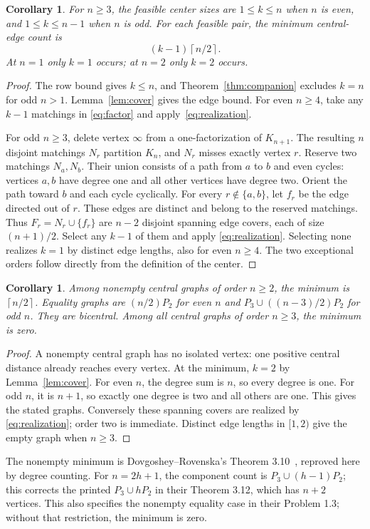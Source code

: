 \documentclass[11pt]{article}
\newtheorem{corollary}[theorem]{Corollary}
\newcommand{\ceil}[1]{\left\lceil #1\right\rceil}
\begin{document}
\begin{corollary}\label{cor:allk}
For $n\ge3$, the feasible center sizes are $1\le k\le n$ when $n$
is even, and $1\le k\le n-1$ when $n$ is odd. For each feasible pair,
the minimum central-edge count is
\[
 (k-1)\ceil{n/2}.
\]
At $n=1$ only $k=1$ occurs; at $n=2$ only $k=2$ occurs.
\end{corollary}
\begin{proof}
The row bound gives $k\le n$, and Theorem~\ref{thm:companion}
excludes $k=n$ for odd $n>1$. Lemma~\ref{lem:cover} gives the edge
bound. For even $n\ge4$, take any $k-1$ matchings in
\eqref{eq:factor} and apply~\eqref{eq:realization}.

For odd $n\ge3$, delete vertex $\infty$ from a one-factorization of
$K_{n+1}$. The resulting $n$ disjoint matchings $N_r$ partition
$K_n$, and $N_r$ misses exactly vertex $r$. Reserve two matchings
$N_a,N_b$. Their union consists of a path from $a$ to $b$ and even
cycles: vertices $a,b$ have degree one and all other vertices have
degree two. Orient the path toward $b$ and each cycle cyclically.
For every $r\notin\{a,b\}$, let $f_r$ be the edge directed out of
$r$. These edges are distinct and belong to the reserved matchings.
Thus $F_r=N_r\cup\{f_r\}$ are $n-2$ disjoint spanning edge covers,
each of size $(n+1)/2$. Select any $k-1$ of them and apply
\eqref{eq:realization}. Selecting none realizes $k=1$ by distinct
edge lengths, also for even $n\ge4$. The two exceptional orders
follow directly from the definition of the center.
\end{proof}

\begin{corollary}\label{cor:graph}
Among nonempty central graphs of order $n\ge2$, the minimum is
$\ceil{n/2}$. Equality graphs are $(n/2)P_2$ for even $n$ and
$P_3\cup((n-3)/2)P_2$ for odd $n$. They are bicentral.
Among all central graphs of order $n\ge3$, the minimum is zero.
\end{corollary}
\begin{proof}
A nonempty central graph has no isolated vertex: one positive
central distance already reaches every vertex. At the minimum,
$k=2$ by Lemma~\ref{lem:cover}. For even $n$, the degree sum is $n$,
so every degree is one. For odd $n$, it is $n+1$, so exactly one
degree is two and all others are one. This gives the stated graphs.
Conversely these spanning covers are realized by
\eqref{eq:realization}; order two is immediate. Distinct edge lengths
in $[1,2)$ give the empty graph when $n\ge3$.
\end{proof}
The nonempty minimum is Dovgoshey--Rovenska's
Theorem 3.10~\cite{DR}, reproved here by degree counting.
For $n=2h+1$, the component count is $P_3\cup(h-1)P_2$;
this corrects the printed $P_3\cup hP_2$ in their Theorem 3.12,
which has $n+2$ vertices. This also specifies the nonempty equality
case in their Problem 1.3; without that restriction, the minimum is zero.
\end{document}
